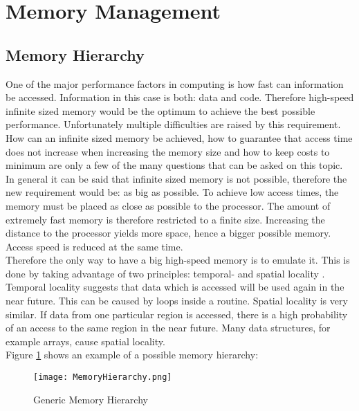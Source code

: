 \section{Memory Management}
\subsection{Memory Hierarchy}
One of the major performance factors in computing is how fast can information be accessed. Information in this case is both: data and code. Therefore high-speed infinite sized memory would be the optimum to achieve the best possible performance. Unfortunately multiple difficulties are raised by this requirement. How can an infinite sized memory be achieved, how to guarantee that access time does not increase when increasing the memory size and how to keep costs to minimum are only a few of the many questions that can be asked on this topic.\\
In general it can be said that infinite sized memory is not possible, therefore the new requirement would be: as big as possible. To achieve low access times, the memory must be placed as close as possible to the processor. The amount of extremely fast memory is therefore restricted to a finite size. Increasing the distance to the processor yields more space, hence a bigger possible memory. Access speed is reduced at the same time.\\
Therefore the only way to have a big high-speed memory is to emulate it. This is done by taking advantage of two principles: temporal- and spatial locality \cite{patterson:2017}. 
Temporal locality suggests that data which is accessed will be used again in the near future. This can be caused by loops inside a routine. 
Spatial locality is very similar. If data from one particular region is accessed, there is a high probability of an access to the same region in the near future. Many data structures, for example arrays, cause spatial locality.\\
Figure \ref{fig:memHierarchy} shows an example of a possible memory hierarchy: 

\begin{figure}[h]
	\centering
	\texttt{[image: MemoryHierarchy.png]}
	\caption{Generic Memory Hierarchy \cite{picture:memoryhierarchy}}
	\label{fig:memHierarchy}
\end{figure}
 
